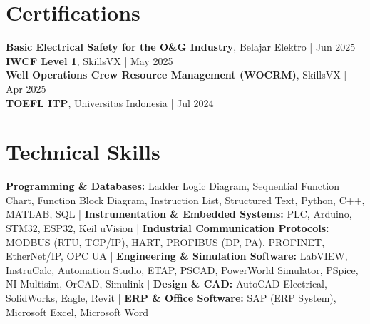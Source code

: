 \documentclass[10pt,a4paper]{article}
\begin{document}
\section*{Certifications}

\textbf{Basic Electrical Safety for the O\&G Industry}, Belajar Elektro \quad | \quad Jun 2025 \\
\textbf{IWCF Level 1}, SkillsVX \quad | \quad May 2025 \\
\textbf{Well Operations Crew Resource Management (WOCRM)}, SkillsVX \quad | \quad Apr 2025 \\
\textbf{TOEFL ITP}, Universitas Indonesia \quad | \quad Jul 2024

\section*{Technical Skills}

\noindent %
\textbf{Programming \& Databases:} Ladder Logic Diagram, Sequential Function Chart, Function Block Diagram, Instruction List, Structured Text, Python, C++, MATLAB, SQL \quad | \quad
\textbf{Instrumentation \& Embedded Systems:} PLC, Arduino, STM32, ESP32, Keil uVision \quad | \quad
\textbf{Industrial Communication Protocols:} MODBUS (RTU, TCP/IP), HART, PROFIBUS (DP, PA), PROFINET, EtherNet/IP, OPC UA \quad | \quad
\textbf{Engineering \& Simulation Software:} LabVIEW, InstruCalc, Automation Studio, ETAP, PSCAD, PowerWorld Simulator, PSpice, NI Multisim, OrCAD, Simulink \quad | \quad
\textbf{Design \& CAD:} AutoCAD Electrical, SolidWorks, Eagle, Revit \quad | \quad
\textbf{ERP \& Office Software:} SAP (ERP System), Microsoft Excel, Microsoft Word
\end{document}
